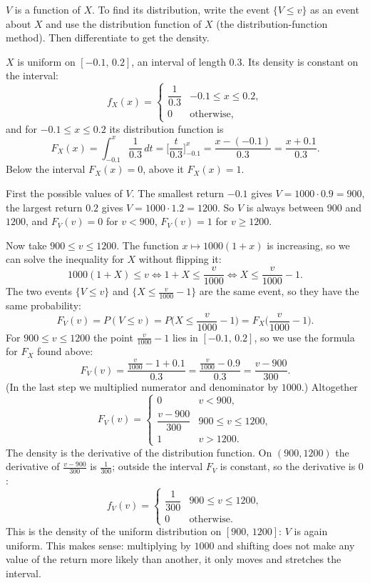 \begin{solution}
	\idea $V$ is a function of $X$. To find its distribution, write the event
	$\{V\le v\}$ as an event about $X$ and use the distribution function of $X$
	(the distribution-function method). Then differentiate to get the density.

	 $X$ is uniform on $[-0.1,\,0.2]$, an
	interval of length $0.3$. Its density is constant on the interval:
	\[
		f_X(x)=\begin{cases}
			\dfrac{1}{0.3} & -0.1\le x\le 0.2, \\[6pt]
			0              & \text{otherwise},
		\end{cases}
	\]
	and for $-0.1\le x\le0.2$ its distribution function is
	\[
		F_X(x)=\int_{-0.1}^{x}\frac{1}{0.3}\,dt
		=\Big[\frac{t}{0.3}\Big]_{-0.1}^{x}
		=\frac{x-(-0.1)}{0.3}=\frac{x+0.1}{0.3}.
	\]
	Below the interval $F_X(x)=0$, above it $F_X(x)=1$.

	 First the possible values of $V$. The smallest return $-0.1$
	gives $V=1000\cdot0.9=900$, the largest return $0.2$ gives
	$V=1000\cdot1.2=1200$. So $V$ is always between $900$ and $1200$, and
	$F_V(v)=0$ for $v<900$, $F_V(v)=1$ for $v\ge1200$.

	Now take $900\le v\le 1200$. The function $x\mapsto1000(1+x)$ is
	increasing, so we can solve the inequality for $X$ without flipping it:
	\[
		1000(1+X)\le v
		\iff 1+X\le\frac{v}{1000}
		\iff X\le\frac{v}{1000}-1.
	\]
	The two events $\{V\le v\}$ and $\{X\le \frac{v}{1000}-1\}$ are the same
	event, so they have the same probability:
	\[
		F_V(v)=P(V\le v)=P\Big(X\le\frac{v}{1000}-1\Big)
		=F_X\Big(\frac{v}{1000}-1\Big).
	\]
	For $900\le v\le1200$ the point $\frac{v}{1000}-1$ lies in
	$[-0.1,\,0.2]$, so we use the formula for $F_X$ found above:
	\[
		F_V(v)=\frac{\frac{v}{1000}-1+0.1}{0.3}
		=\frac{\frac{v}{1000}-0.9}{0.3}
		=\frac{v-900}{300}.
	\]
	(In the last step we multiplied numerator and denominator by $1000$.)
	Altogether
	\[
		F_V(v)=\begin{cases}
			0                  & v<900,            \\[4pt]
			\dfrac{v-900}{300} & 900\le v\le 1200, \\[6pt]
			1                  & v>1200.
		\end{cases}
	\]
	The density is the derivative of the distribution function. On
	$(900,1200)$ the derivative of $\frac{v-900}{300}$ is $\frac1{300}$;
	outside the interval $F_V$ is constant, so the derivative is $0$:
	\[
		f_V(v)=\begin{cases}
			\dfrac{1}{300} & 900\le v\le 1200, \\[6pt]
			0              & \text{otherwise}.
		\end{cases}
	\]
	This is the density of the uniform distribution on $[900,\,1200]$: $V$ is
	again uniform. This makes sense: multiplying by $1000$ and shifting does
	not make any value of the return more likely than another, it only moves
	and stretches the interval.


\end{solution}
